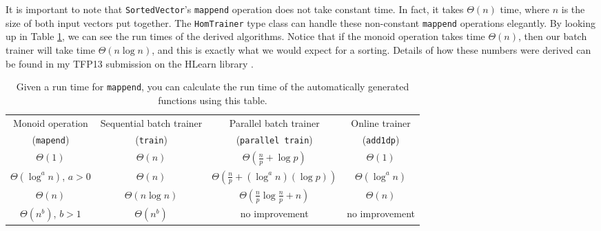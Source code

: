 \documentclass[tikz]{tmr}
\newcommand\h{\lstinline}
\newcommand\+{\mdoubleplus}
\begin{document}
It is important to note that \h{SortedVector}'s \h{mappend} operation does not take constant time.
In fact, it takes $\Theta(n)$ time, where $n$ is the size of both input vectors put together.
The \h{HomTrainer} type class can handle these non-constant \h{mappend} operations elegantly.
By looking up in Table \ref{table:rt}, we can see the run times of the derived algorithms.
Notice that if the monoid operation takes time $\Theta(n)$, then our batch trainer will take time $\Theta(n\log n)$, and this is exactly what we would expect for a sorting.
Details of how these numbers were derived can be found in my TFP13 submission on the HLearn library \cite{me_tfp13}.

\begin{table}[H]
\caption{Given a run time for \h{mappend}, you can calculate the run time of the automatically generated functions using this table.}
\label{table:rt}
\hspace{-0.3in}
\begin{tabular}{ c c c c }
\hline
Monoid operation & Sequential batch trainer & \ \ Parallel batch trainer\ \ & Online trainer\\
\mbox{(\h{mapend})} & \mbox{(\h{train})} & \mbox{(\h{parallel train})} & \mbox{(\h{add1dp})}\\
\hline \hline
$\Theta(1)$ & $\Theta(n)$ & $\Theta\left(\frac{n}{p}+\log p\right)$ & $\Theta(1)$ \\
$\Theta(\log^a n)$, $a>0$ & $\Theta(n)$ & $\Theta\left(\frac{n}{p}+(\log^a n)(\log p)\right)$ & $\Theta(\log^a n)$ \\
$\Theta(n)$ & $\Theta(n\log n)$ & $\Theta\left(\frac{n}{p}\log\frac{n}{p}+n\right)$ & $\Theta(n)$ \\
$\Theta(n^b)$, $b>1$ & $\Theta(n^b)$ & no improvement & no improvement\\
\hline
\end{tabular}
\end{table}
\end{document}
